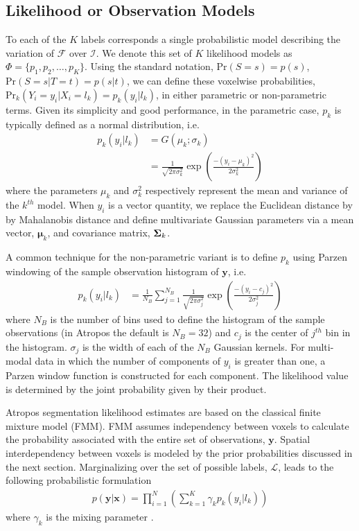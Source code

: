 \documentclass[11pt,english]{article}
\begin{document}
\subsection{Likelihood or Observation Models}
To each of the $K$ labels corresponds a single probabilistic model describing the variation of $\mathcal{F}$ over $\mathcal{I}$.  We denote this set of $K$ likelihood models as $\Phi = \{p_1, p_2, \ldots, p_K\}$.  Using the standard notation, $\mathrm{Pr}(S=s) = p(s)$, $\mathrm{Pr}(S=s|T=t) = p(s|t)$, we can define these voxelwise probabilities, $\mathrm{Pr}_k( Y_i = y_i | X_i = l_k ) = p_k(y_i|l_k)$, in either parametric or non-parametric terms.   Given its simplicity and good performance, in the parametric case, $p_k$ is typically defined as a normal distribution, i.e.
\begin{align}\label{eq:param}
  p_k\left(y_i|l_k\right) &= G\left(\mu_k;\sigma_k\right) \nonumber \\
                    &= \frac{1}{\sqrt{2\pi \sigma_k^2}}\exp\left( \frac{ -(y_i - \mu_k)^2 }{2\sigma_k^2} \right)
\end{align}
where the parameters $\mu_k$ and $\sigma_k^2$ respectively represent
the mean and variance of the $k^{th}$ model.  When $y_i$ is a vector
quantity, we replace the Euclidean distance by by Mahalanobis distance
and define multivariate Gaussian parameters via a mean vector,
$\boldsymbol{\mu}_k$, and covariance matrix, ${\bf \Sigma}_k$.

A common technique for the non-parametric variant is to define $p_k$ using Parzen windowing of the sample observation histogram of $\mathbf{y}$, i.e.
\begin{align} \label{eq:nonparam}
  p_k\left(y_i|l_k\right) &= \frac{1}{N_B} \sum_{j=1}^{N_B} \frac{1}{\sqrt{2\pi \sigma_j^2}}\exp\left( \frac{ -(y_i - c_j)^2 }{2\sigma_j^2} \right)
\end{align}
where $N_B$ is the number of bins used to define the histogram of the sample observations (in Atropos the default is $N_B = 32$) and $c_j$ is the center of $j^{th}$ bin in the histogram.  $\sigma_j$ is the width of each of the $N_B$ Gaussian kernels.  For multi-modal data in which the number of components of $y_i$ is greater than one, a Parzen window function is constructed for each component.  The likelihood value is determined by the joint probability given by their product.

Atropos segmentation likelihood estimates are based on the classical finite mixture model (FMM).
FMM assumes independency between voxels to calculate the probability
associated with the entire set of observations, $\mathbf{y}$.  Spatial
interdependency between voxels is modeled by the prior probabilities
discussed in the next section.  Marginalizing over the set of possible labels, $\mathcal{L}$, leads to the following probabilistic formulation
\begin{align}\label{eq:likelihood}
  p(\mathbf{y}|\mathbf{x}) = \prod_{i=1}^N \left(      
                                                        \sum_{k=1}^K \gamma_k p_k(y_i|l_k)
                                                        \right)
\end{align}
where $\gamma_k$ is the mixing parameter \citep{Ashburner2005}.  
\end{document}

